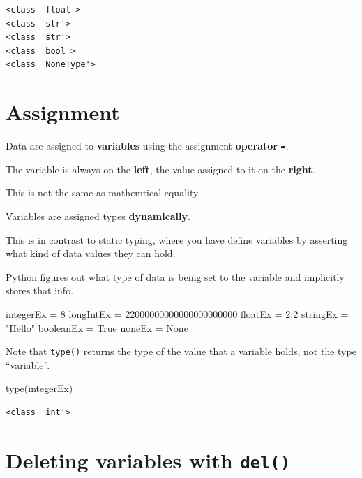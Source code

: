 \documentclass[
  letterpaper,
  DIV=11,
  numbers=noendperiod]{scrreprt}
\newenvironment{Shaded}{\begin{snugshade}}{\end{snugshade}}
\newcommand{\BuiltInTok}[1]{\textcolor[rgb]{0.00,0.23,0.31}{#1}}
\newcommand{\DecValTok}[1]{\textcolor[rgb]{0.68,0.00,0.00}{#1}}
\newcommand{\FloatTok}[1]{\textcolor[rgb]{0.68,0.00,0.00}{#1}}
\newcommand{\NormalTok}[1]{\textcolor[rgb]{0.00,0.23,0.31}{#1}}
\newcommand{\OperatorTok}[1]{\textcolor[rgb]{0.37,0.37,0.37}{#1}}
\newcommand{\StringTok}[1]{\textcolor[rgb]{0.13,0.47,0.30}{#1}}
\newcommand{\VariableTok}[1]{\textcolor[rgb]{0.07,0.07,0.07}{#1}}
\begin{document}
\begin{verbatim}
<class 'float'>
<class 'str'>
<class 'str'>
<class 'bool'>
<class 'NoneType'>
\end{verbatim}

\hypertarget{assignment}{%
\chapter{Assignment}\label{assignment}}

Data are assigned to \textbf{variables} using the assignment
\textbf{operator} \texttt{=}.

The variable is always on the \textbf{left}, the value assigned to it on
the \textbf{right}.

This is not the same as mathemtical equality.

Variables are assigned types \textbf{dynamically}.

This is in contrast to static typing, where you have define variables by
asserting what kind of data values they can hold.

Python figures out what type of data is being set to the variable and
implicitly stores that info.

\begin{Shaded}
\begin{Highlighting}[]
\NormalTok{integerEx }\OperatorTok{=} \DecValTok{8}
\NormalTok{longIntEx }\OperatorTok{=} \DecValTok{22000000000000000000000}
\NormalTok{floatEx }\OperatorTok{=} \FloatTok{2.2}
\NormalTok{stringEx }\OperatorTok{=} \StringTok{"Hello"}
\NormalTok{booleanEx }\OperatorTok{=} \VariableTok{True}
\NormalTok{noneEx }\OperatorTok{=} \VariableTok{None}
\end{Highlighting}
\end{Shaded}

Note that \texttt{type()} returns the type of the value that a variable
holds, not the type ``variable''.

\begin{Shaded}
\begin{Highlighting}[]
\BuiltInTok{type}\NormalTok{(integerEx)}
\end{Highlighting}
\end{Shaded}

\begin{verbatim}
<class 'int'>
\end{verbatim}

\hypertarget{deleting-variables-with-del}{%
\chapter{\texorpdfstring{Deleting variables with
\texttt{del()}}{Deleting variables with del()}}\label{deleting-variables-with-del}}
\end{document}
